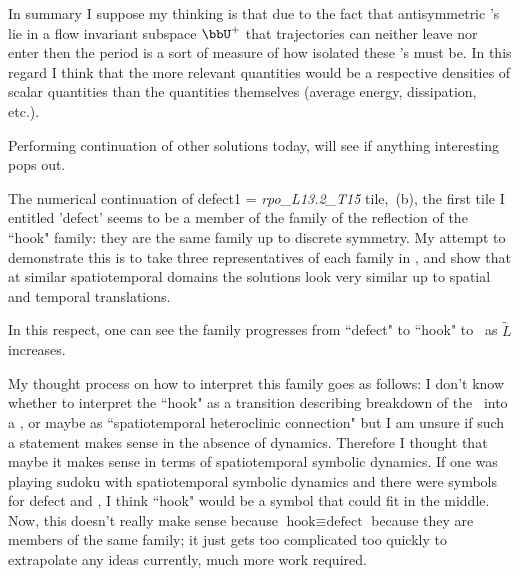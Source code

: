 \begin{description}
{\begin{description}
In summary I suppose my thinking is that due to the fact that
antisymmetric \po 's lie in a flow invariant subspace $\bbU^+$ that
trajectories can neither leave nor enter then the period is a sort of
measure of how isolated these \po 's must be. In this regard I think that
the more relevant quantities would be a respective densities of scalar
quantities than the quantities themselves (average energy, dissipation,
etc.).

Performing continuation of other solutions today, will see if anything
interesting pops out.

\item[defect1 continuation]
The numerical continuation of defect1 = \emph{rpo\_L13.2\_T15}  tile,
\,(b), the first tile I entitled 'defect'
seems to be a member of the family of the reflection of the ``hook"
family: they are the same family up to discrete symmetry. My attempt
to demonstrate this is to take three representatives of each family in
, and show that at similar
spatiotemporal domains the solutions look very similar up to spatial and
temporal translations.

In this respect, one can see the family progresses from ``defect"
 to ``hook" to \reqv\, as $\tilde{L}$ increases.

My thought process on how to interpret this family goes as follows:
I don't know whether to interpret the ``hook" as a transition describing
breakdown of the \twot\ into a \reqv, or maybe as ``spatiotemporal
heteroclinic connection" but I am unsure if such a statement makes sense
in the absence of dynamics. Therefore I thought that maybe it makes sense
in terms of spatiotemporal symbolic dynamics. If one was playing sudoku
with spatiotemporal symbolic dynamics and there were symbols for defect
and \reqv, I think ``hook" would be a symbol that could fit in the
middle. Now, this doesn't really make sense because $\text{hook}\equiv
\text{defect}$ because they are members of the same family; it just gets
too complicated too quickly to extrapolate any ideas currently, much more
work required.
\end{description}
}


\end{description}
